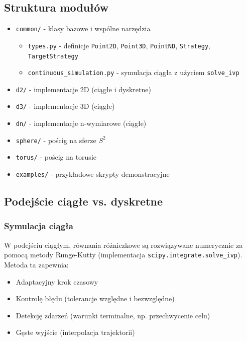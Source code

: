 \documentclass[12pt,a4paper]{article}
\begin{document}
\subsection{Struktura modułów}

\begin{itemize}
    \item \texttt{common/} - klasy bazowe i wspólne narzędzia
    \begin{itemize}
        \item \texttt{types.py} - definicje \texttt{Point2D}, \texttt{Point3D}, \texttt{PointND}, \texttt{Strategy}, \texttt{TargetStrategy}
        \item \texttt{continuous\_simulation.py} - symulacja ciągła z użyciem \texttt{solve\_ivp}
    \end{itemize}
    \item \texttt{d2/} - implementacje 2D (ciągłe i dyskretne)
    \item \texttt{d3/} - implementacje 3D (ciągłe)
    \item \texttt{dn/} - implementacje n-wymiarowe (ciągłe)
    \item \texttt{sphere/} - pościg na sferze $S^2$
    \item \texttt{torus/} - pościg na torusie
    \item \texttt{examples/} - przykładowe skrypty demonstracyjne
\end{itemize}

\subsection{Podejście ciągłe vs. dyskretne}

\subsubsection{Symulacja ciągła}

W podejściu ciągłym, równania różniczkowe są rozwiązywane numerycznie za pomocą metody Runge-Kutty (implementacja \texttt{scipy.integrate.solve\_ivp}). Metoda ta zapewnia:
\begin{itemize}
    \item Adaptacyjny krok czasowy
    \item Kontrolę błędu (tolerancje względne i bezwzględne)
    \item Detekcję zdarzeń (warunki terminalne, np. przechwycenie celu)
    \item Gęste wyjście (interpolacja trajektorii)
\end{itemize}
\end{document}
